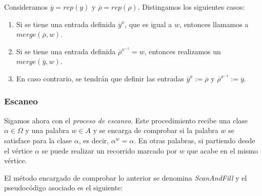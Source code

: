 Consideramos $\overline{y}=rep(y)$ y $\overline{\rho}=rep(\rho)$. Distingamos los siguientes casos:
\begin{enumerate}
    \item  Si se tiene una entrada definida $\overline{y}^x$, que es igual a $w$, entonces llamamos a $merge(\overline{\rho}, w)$. 
\item Si se tiene una entrada definida $\overline{\rho}^{x^{-1}}=w$, entonces realizamos un $merge(\overline{y}, w)$. 
\item En caso contrario, se tendrán que definir las entradas $\overline{y}^x:=\overline{\rho}$ y $\overline{\rho}^{x^{-1}}:=\overline{y}$.
\end{enumerate}



\newpage
\subsubsection{Escaneo}
Sigamos ahora con el \textit{proceso de escaneo}. Este procedimiento recibe una clase $\alpha \in \Omega$ y una palabra $w \in A$ y se encarga de comprobar si la palabra $w$ se satisface para la clase $\alpha$, es decir, $\alpha^w=\alpha$. En otras palabras, si partiendo desde el vértice $\alpha$ se puede realizar un recorrido marcado por $w$ que acabe en el mismo vértice.

El método encargado de comprobar lo anterior se denomina \textit{ScanAndFill} y el pseudocódigo asociado es el siguiente:




